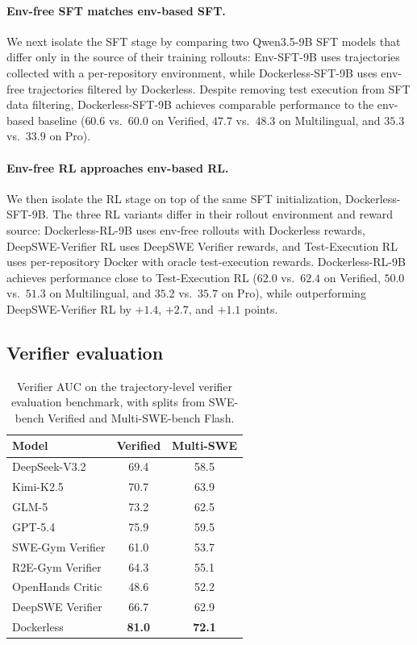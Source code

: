 \documentclass{llmxive}
\providecommand{\approach}{Dockerless\xspace}
\begin{document}
\paragraph{Env-free SFT matches env-based SFT.}
We next isolate the SFT stage by comparing two Qwen3.5-9B SFT models that differ only in the source of their training rollouts: Env-SFT-9B uses trajectories collected with a per-repository environment, while \approach-SFT-9B uses env-free trajectories filtered by \approach.
Despite removing test execution from SFT data filtering, \approach-SFT-9B achieves comparable performance to the env-based baseline ($60.6$ vs.\ $60.0$ on Verified, $47.7$ vs.\ $48.3$ on Multilingual, and $35.3$ vs.\ $33.9$ on Pro).

\paragraph{Env-free RL approaches env-based RL.}
We then isolate the RL stage on top of the same SFT initialization, \approach-SFT-9B.
The three RL variants differ in their rollout environment and reward source: \approach-RL-9B uses env-free rollouts with \approach rewards, DeepSWE-Verifier RL uses DeepSWE Verifier rewards, and Test-Execution RL uses per-repository Docker with oracle test-execution rewards.
\approach-RL-9B achieves performance close to Test-Execution RL ($62.0$ vs.\ $62.4$ on Verified, $50.0$ vs.\ $51.3$ on Multilingual, and $35.2$ vs.\ $35.7$ on Pro), while outperforming DeepSWE-Verifier RL by $+1.4$, $+2.7$, and $+1.1$ points.

\subsection{Verifier evaluation}
\label{sec:verifier-eval}
\begin{table}[t]
\centering
\small
\begin{tabular}{lcc}
\toprule
\textbf{Model}
& \textbf{Verified}
& \textbf{Multi-SWE} \\
\midrule
DeepSeek-V3.2          & 69.4 & 58.5 \\
Kimi-K2.5              & 70.7 & 63.9 \\
GLM-5                  & 73.2 & 62.5 \\
GPT-5.4                & 75.9 & 59.5 \\
\midrule
SWE-Gym Verifier       & 61.0 & 53.7 \\
R2E-Gym Verifier       & 64.3 & 55.1 \\
OpenHands Critic       & 48.6 & 52.2 \\
DeepSWE Verifier       & 66.7 & 62.9 \\
\midrule
\rowcolor{black!4}
\approach              & \textbf{81.0} & \textbf{72.1} \\
\bottomrule
\end{tabular}
\caption{
Verifier AUC on the trajectory-level verifier evaluation benchmark, with splits from SWE-bench Verified and Multi-SWE-bench Flash.
}
\label{tab:rm-bench}
\end{table}
\end{document}
